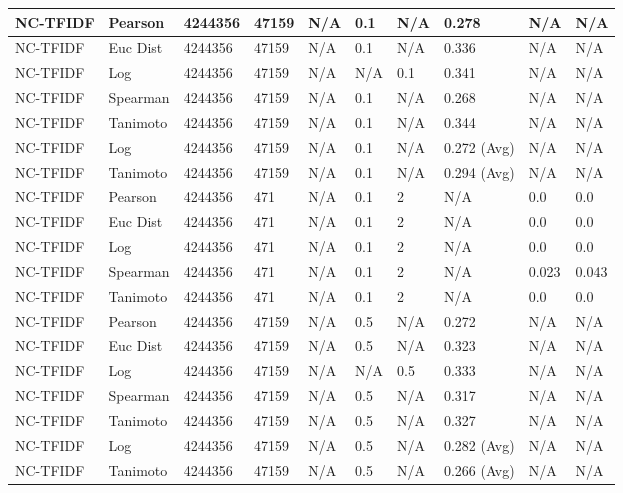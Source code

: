 \documentclass{article}
\begin{document}
\begin{longtable}{ |p{1.7cm}|p{1.9cm}|p{1.5cm}|p{1.5cm}|p{0.75cm}|p{0.75cm}|p{0.75cm}|p{0.75cm}|p{1.5cm}|p{1.5cm}|}
    NC-TFIDF & Pearson & 4244356 & 47159 & N/A & 0.1 & N/A & 0.278 & N/A & N/A  \\ \hline
    NC-TFIDF  & Euc Dist & 4244356 & 47159 & N/A & 0.1 & N/A & 0.336 & N/A & N/A   \\ \hline
    NC-TFIDF  & Log & 4244356 & 47159 & N/A &  N/A & 0.1 & 0.341 & N/A & N/A  \\ \hline
    NC-TFIDF  & Spearman & 4244356 & 47159 & N/A & 0.1 & N/A & 0.268 & N/A & N/A \\ \hline
    NC-TFIDF  & Tanimoto & 4244356 & 47159 & N/A & 0.1 & N/A & 0.344 & N/A & N/A \\ \hline
    NC-TFIDF  & Log & 4244356 & 47159 & N/A & 0.1 & N/A & 0.272 (Avg) & N/A & N/A \\ \hline
    NC-TFIDF  & Tanimoto & 4244356 & 47159 & N/A & 0.1 & N/A & 0.294 (Avg) & N/A & N/A \\ \hline
    
    NC-TFIDF  & Pearson & 4244356 & 471 & N/A & 0.1 & 2 & N/A & 0.0 & 0.0  \\ \hline
    NC-TFIDF  & Euc Dist & 4244356 & 471 & N/A & 0.1 & 2 & N/A &0.0 & 0.0   \\ \hline
    NC-TFIDF  & Log & 4244356 & 471 & N/A & 0.1 & 2 & N/A & 0.0 & 0.0  \\ \hline
    NC-TFIDF  & Spearman & 4244356 & 471 & N/A & 0.1 & 2 & N/A &0.023 & 0.043 \\ \hline
    NC-TFIDF  & Tanimoto & 4244356 & 471 & N/A & 0.1 & 2 & N/A & 0.0 & 0.0 \\ \hline
    
    NC-TFIDF & Pearson & 4244356 & 47159 & N/A & 0.5 & N/A & 0.272 & N/A & N/A  \\ \hline
    NC-TFIDF  & Euc Dist & 4244356 & 47159 & N/A & 0.5 & N/A & 0.323 & N/A & N/A   \\ \hline
    NC-TFIDF  & Log & 4244356 & 47159 & N/A &  N/A & 0.5 & 0.333 & N/A & N/A  \\ \hline
    NC-TFIDF  & Spearman & 4244356 & 47159 & N/A & 0.5 & N/A & 0.317 & N/A & N/A \\ \hline
    NC-TFIDF  & Tanimoto & 4244356 & 47159 & N/A & 0.5 & N/A & 0.327 & N/A & N/A \\ \hline
    NC-TFIDF  & Log & 4244356 & 47159 & N/A & 0.5 & N/A & 0.282 (Avg) & N/A & N/A \\ \hline
    NC-TFIDF  & Tanimoto & 4244356 & 47159 & N/A & 0.5 & N/A & 0.266 (Avg) & N/A & N/A \\ \hline
    

\end{longtable}
\end{document}
